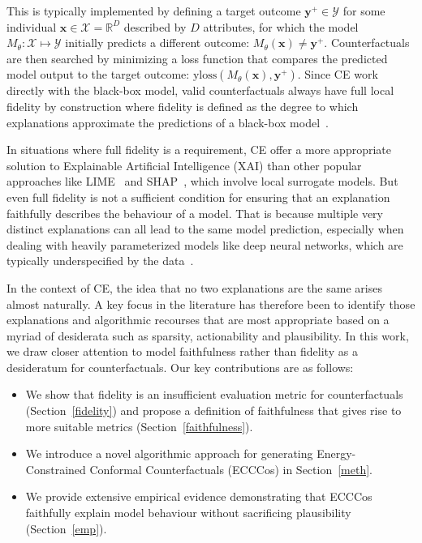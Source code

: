 \documentclass{article}
\begin{document}
This is typically implemented by defining a target outcome $\mathbf{y}^+ \in \mathcal{Y}$ for some individual $\mathbf{x} \in \mathcal{X}=\mathbb{R}^D$ described by $D$ attributes, for which the model $M_{\theta}:\mathcal{X}\mapsto\mathcal{Y}$ initially predicts a different outcome: $M_{\theta}(\mathbf{x})\ne \mathbf{y}^+$. Counterfactuals are then searched by minimizing a loss function that compares the predicted model output to the target outcome: $\text{yloss}(M_{\theta}(\mathbf{x}),\mathbf{y}^+)$. Since CE work directly with the black-box model, valid counterfactuals always have full local fidelity by construction where fidelity is defined as the degree to which explanations approximate the predictions of a black-box model~\citep{mothilal2020explaining,molnar2020interpretable}. 

In situations where full fidelity is a requirement, CE offer a more appropriate solution to Explainable Artificial Intelligence (XAI) than other popular approaches like LIME~\citep{ribeiro2016why} and SHAP~\citep{lundberg2017unified}, which involve local surrogate models. But even full fidelity is not a sufficient condition for ensuring that an explanation faithfully describes the behaviour of a model. That is because multiple very distinct explanations can all lead to the same model prediction, especially when dealing with heavily parameterized models like deep neural networks, which are typically underspecified by the data~\citep{wilson2020case}.

In the context of CE, the idea that no two explanations are the same arises almost naturally. A key focus in the literature has therefore been to identify those explanations and algorithmic recourses that are most appropriate based on a myriad of desiderata such as sparsity, actionability and plausibility. In this work, we draw closer attention to model faithfulness rather than fidelity as a desideratum for counterfactuals. Our key contributions are as follows: 

\begin{itemize}
  \item We show that fidelity is an insufficient evaluation metric for counterfactuals (Section~\ref{fidelity}) and propose a definition of faithfulness that gives rise to more suitable metrics (Section~\ref{faithfulness}).
  \item We introduce a novel algorithmic approach for generating Energy-Constrained Conformal Counterfactuals (ECCCos) in Section~\ref{meth}.
  \item We provide extensive empirical evidence demonstrating that ECCCos faithfully explain model behaviour without sacrificing plausibility (Section~\ref{emp}).
\end{itemize}
\end{document}
